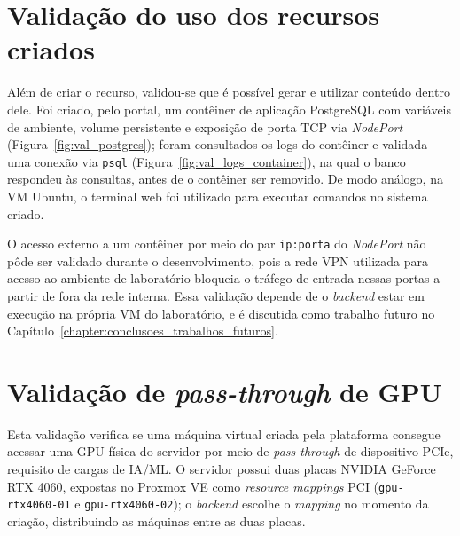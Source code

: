 
\section{Validação do uso dos recursos criados}
\label{sec:val_conteudo}

Além de criar o recurso, validou-se que é possível gerar e utilizar conteúdo dentro dele. Foi criado, pelo portal, um contêiner de aplicação PostgreSQL com variáveis de ambiente, volume persistente e exposição de porta TCP via \textit{NodePort} (Figura~\ref{fig:val_postgres}); foram consultados os logs do contêiner e validada uma conexão via \texttt{psql} (Figura~\ref{fig:val_logs_container}), na qual o banco respondeu às consultas, antes de o contêiner ser removido. De modo análogo, na VM Ubuntu, o terminal web foi utilizado para executar comandos no sistema criado.

\par O acesso externo a um contêiner por meio do par \texttt{ip:porta} do \textit{NodePort} não pôde ser validado durante o desenvolvimento, pois a rede VPN utilizada para acesso ao ambiente de laboratório bloqueia o tráfego de entrada nessas portas a partir de fora da rede interna. Essa validação depende de o \textit{backend} estar em execução na própria VM do laboratório, e é discutida como trabalho futuro no Capítulo~\ref{chapter:conclusoes_trabalhos_futuros}.



\section{Validação de \textit{pass-through} de GPU}
\label{sec:val_gpu}

Esta validação verifica se uma máquina virtual criada pela plataforma consegue acessar uma GPU física do servidor por meio de \textit{pass-through} de dispositivo PCIe, requisito de cargas de IA/ML. O servidor possui duas placas NVIDIA GeForce RTX 4060, expostas no Proxmox VE como \textit{resource mappings} PCI (\texttt{gpu-rtx4060-01} e \texttt{gpu-rtx4060-02}); o \textit{backend} escolhe o \textit{mapping} no momento da criação, distribuindo as máquinas entre as duas placas.

